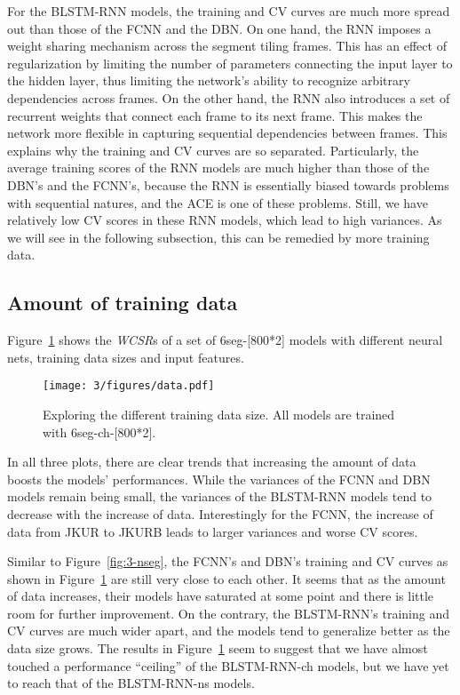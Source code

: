 For the BLSTM-RNN models, the training and CV curves are much more spread out than those of the FCNN and the DBN. On one hand, the RNN imposes a weight sharing mechanism across the segment tiling frames. This has an effect of regularization by limiting the number of parameters connecting the input layer to the hidden layer, thus limiting the network's ability to recognize arbitrary dependencies across frames. On the other hand, the RNN also introduces a set of recurrent weights that connect each frame to its next frame. This makes the network more flexible in capturing sequential dependencies between frames. This explains why the training and CV curves are so separated. Particularly, the average training scores of the RNN models are much higher than those of the DBN's and the FCNN's, because the RNN is essentially biased towards problems with sequential natures, and the ACE is one of these problems. Still, we have relatively low CV scores in these RNN models, which lead to high variances. As we will see in the following subsection, this can be remedied by more training data.

\subsection{Amount of training data}\label{sec:3-p5}
Figure~\ref{fig:3-data} shows the \textit{WCSR}s of a set of 6seg-[800*2] models with different neural nets, training data sizes and input features.
\begin{figure}[h!]
	\centering
	\texttt{[image: 3/figures/data.pdf]}
	\caption{Exploring the different training data size. All models are trained with 6seg-ch-[800*2].}
	\label{fig:3-data}
\end{figure}

In all three plots, there are clear trends that increasing the amount of data boosts the models' performances. While the variances of the FCNN and DBN models remain being small, the variances of the BLSTM-RNN models tend to decrease with the increase of data. Interestingly for the FCNN, the increase of data from JKUR to JKURB leads to larger variances and worse CV scores.

Similar to Figure~\ref{fig:3-nseg}, the FCNN's and DBN's training and CV curves as shown in Figure~\ref{fig:3-data} are still very close to each other. It seems that as the amount of data increases, their models have saturated at some point and there is little room for further improvement. On the contrary, the BLSTM-RNN's training and CV curves are much wider apart, and the models tend to generalize better as the data size grows. The results in Figure~\ref{fig:3-data} seem to suggest that we have almost touched a performance ``ceiling'' of the BLSTM-RNN-ch models, but we have yet to reach that of the BLSTM-RNN-ns models.

